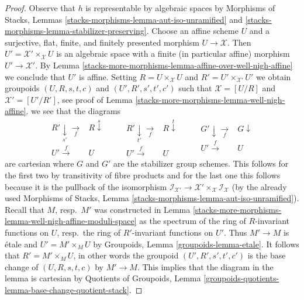 \begin{proof}
Observe that $h$ is representable by algebraic spaces by
Morphisms of Stacks, Lemmas
\ref{stacks-morphisms-lemma-aut-iso-unramified} and
\ref{stacks-morphisms-lemma-stabilizer-preserving}.
Choose an affine scheme $U$ and a
surjective, flat, finite, and finitely presented morphism $U \to \mathcal{X}$.
Then $U' = \mathcal{X}' \times_\mathcal{X} U$ is an algebraic
space with a finite (in particular affine) morphism $U' \to \mathcal{X}'$.
By Lemma \ref{stacks-more-morphisms-lemma-affine-over-well-nigh-affine}
we conclude that $U'$ is affine.
Setting $R = U \times_\mathcal{X} U$ and $R' = U' \times_{\mathcal{X}'} U'$
we obtain groupoids $(U, R, s, t, c)$ and $(U', R', s', t', c')$
such that $\mathcal{X} = [U/R]$ and $\mathcal{X}' = [U'/R']$,
see proof of Lemma \ref{stacks-more-morphisms-lemma-well-nigh-affine}.
we see that the diagrams
$$
\begin{array}{cc}R' \underset{s'}{\downarrow}\underset{f}{\longrightarrow} & R \overset{s}{\downarrow} \\ U' \overset{f}{\longrightarrow} & U\end{array}
\quad
\quad
\begin{array}{cc}R' \underset{t'}{\downarrow}\underset{f}{\longrightarrow} & R \overset{t}{\downarrow} \\ U' \overset{f}{\longrightarrow} & U\end{array}
\quad
\quad
\begin{array}{cc}G' \downarrow\underset{f}{\longrightarrow} & G \downarrow \\ U' \overset{f}{\longrightarrow} & U\end{array}
$$
are cartesian where $G$ and $G'$ are the stabilizer group schemes.
This follows for the first two by transitivity of fibre products
and for the last one this follows because it is the pullback of the
isomorphism $\mathcal{I}_{\mathcal{X}'} \to
\mathcal{X}' \times_\mathcal{X} \mathcal{I}_\mathcal{X}$
(by the already used Morphisms of Stacks, Lemma
\ref{stacks-morphisms-lemma-aut-iso-unramified}).
Recall that $M$, resp.\ $M'$ was constructed in
Lemma \ref{stacks-more-morphisms-lemma-well-nigh-affine-moduli-space}
as the spectrum of the ring of $R$-invariant functions on $U$,
resp.\ the ring of $R'$-invariant functions on $U'$.
Thus $M' \to M$ is \'etale and $U' = M' \times_M U$
by Groupoids, Lemma \ref{groupoids-lemma-etale}.
It follows that $R' = M' \times_M U$, in other words
the groupoid $(U', R', s', t', c')$ is the base change of
$(U, R, s, t, c)$ by $M' \to M$.
This implies that the diagram in the lemma is
cartesian by
Quotients of Groupoids, Lemma
\ref{groupoids-quotients-lemma-base-change-quotient-stack}.
\end{proof}

